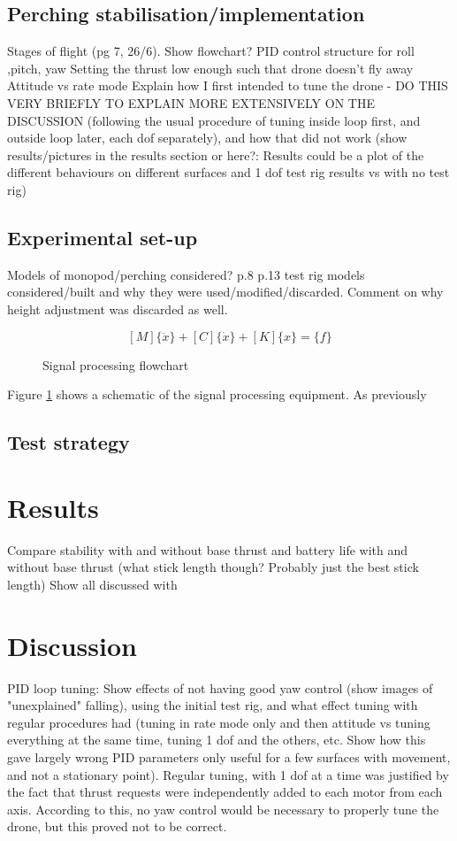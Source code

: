 \documentclass[12pt,a4paper]{article}
\begin{document}
\subsection{Perching stabilisation/implementation}
Stages of flight (pg 7, 26/6). Show flowchart?
PID control structure for roll ,pitch, yaw
Setting the thrust low enough such that drone doesn't fly away
Attitude vs rate mode
Explain how I first intended to tune the drone - DO THIS VERY BRIEFLY TO EXPLAIN MORE EXTENSIVELY ON THE DISCUSSION (following the usual procedure of tuning inside loop first, and outside loop later, each dof separately), and how that did not work (show results/pictures in the results section or here?: Results could be a plot of the different behaviours on different surfaces and 1 dof test rig results vs with no test rig) 


\subsection{Experimental set-up}
Models of monopod/perching considered? p.8
p.13 test rig models considered/built and why they were used/modified/discarded. Comment on why height adjustment was discarded as well.


\begin{equation} \label{eq1}
[M]\{\ddot{x}\}+[C]\{\dot{x}\}+[K]\{x\} = \{f\}
\end{equation}

\begin{figure}[h!]
\centering
  \caption{Signal processing flowchart}
  \label{fig1}
\end{figure}
Figure \ref{fig1} shows a schematic of the signal processing equipment. As previously \subsection{Test strategy}

\section{Results} \label{results}
Compare stability with and without base thrust and battery life with and without base thrust (what stick length though? Probably just the best stick length)
Show all discussed with 
\section{Discussion}
PID loop tuning: Show effects of not having good yaw control (show images of "unexplained" falling), using the initial test rig, and what effect tuning with regular procedures had (tuning in rate mode only and then attitude vs tuning everything at the same time, tuning 1 dof and the others, etc. Show how this gave largely wrong PID parameters only useful for a few surfaces with movement, and not a stationary point). Regular tuning, with 1 dof at a time was justified by the fact that thrust requests were independently added to each motor from each axis. According to this, no yaw control would be necessary to properly tune the drone, but this proved not to be correct.
\end{document}
